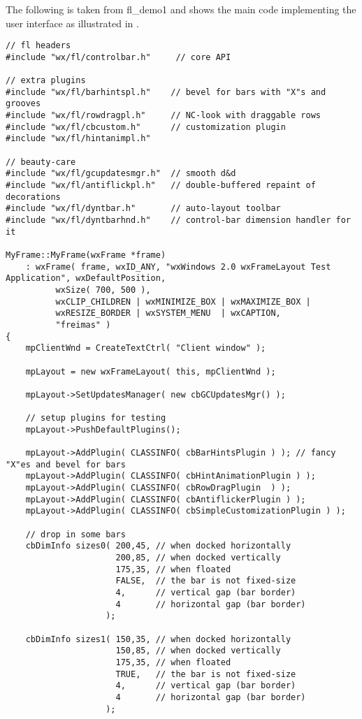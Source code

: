 The following is taken from fl\_demo1 and shows the main code implementing the
user interface as illustrated in .

\begin{verbatim}
// fl headers
#include "wx/fl/controlbar.h"     // core API

// extra plugins
#include "wx/fl/barhintspl.h"    // bevel for bars with "X"s and grooves
#include "wx/fl/rowdragpl.h"     // NC-look with draggable rows
#include "wx/fl/cbcustom.h"      // customization plugin
#include "wx/fl/hintanimpl.h"

// beauty-care
#include "wx/fl/gcupdatesmgr.h"  // smooth d&d
#include "wx/fl/antiflickpl.h"   // double-buffered repaint of decorations
#include "wx/fl/dyntbar.h"       // auto-layout toolbar
#include "wx/fl/dyntbarhnd.h"    // control-bar dimension handler for it

MyFrame::MyFrame(wxFrame *frame)
    : wxFrame( frame, wxID_ANY, "wxWindows 2.0 wxFrameLayout Test Application", wxDefaultPosition,
          wxSize( 700, 500 ),
          wxCLIP_CHILDREN | wxMINIMIZE_BOX | wxMAXIMIZE_BOX |
          wxRESIZE_BORDER | wxSYSTEM_MENU  | wxCAPTION,
          "freimas" )
{
    mpClientWnd = CreateTextCtrl( "Client window" );

    mpLayout = new wxFrameLayout( this, mpClientWnd );

    mpLayout->SetUpdatesManager( new cbGCUpdatesMgr() );

    // setup plugins for testing
    mpLayout->PushDefaultPlugins();

    mpLayout->AddPlugin( CLASSINFO( cbBarHintsPlugin ) ); // fancy "X"es and bevel for bars
    mpLayout->AddPlugin( CLASSINFO( cbHintAnimationPlugin ) );
    mpLayout->AddPlugin( CLASSINFO( cbRowDragPlugin  ) );
    mpLayout->AddPlugin( CLASSINFO( cbAntiflickerPlugin ) );
    mpLayout->AddPlugin( CLASSINFO( cbSimpleCustomizationPlugin ) );

    // drop in some bars
    cbDimInfo sizes0( 200,45, // when docked horizontally
                      200,85, // when docked vertically
                      175,35, // when floated
                      FALSE,  // the bar is not fixed-size
                      4,      // vertical gap (bar border)
                      4       // horizontal gap (bar border)
                    );

    cbDimInfo sizes1( 150,35, // when docked horizontally
                      150,85, // when docked vertically
                      175,35, // when floated
                      TRUE,   // the bar is not fixed-size
                      4,      // vertical gap (bar border)
                      4       // horizontal gap (bar border)
                    );


\end{verbatim}
